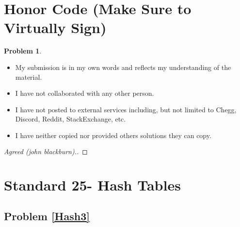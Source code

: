 \documentclass[11pt]{article}
\theoremstyle{definition}
\theoremstyle{definition}
\newtheorem{required}{Problem}
\theoremstyle{definition}
\begin{document}
\section{Honor Code (Make Sure to Virtually Sign)} \label{HonorCode}

\begin{required}
\noindent 
\begin{itemize}
\item My submission is in my own words and reflects my understanding of the material.
\item I have not collaborated with any other person.
\item I have not posted to external services including, but not limited to Chegg, Discord, Reddit, StackExchange, etc.
\item I have neither copied nor provided others solutions they can copy.
\end{itemize}

\end{required}

\begin{proof}[Agreed (john blackburn).]
\end{proof}


\newpage
\section{Standard 25- Hash Tables}
\subsection{Problem \ref{Hash3}}
\end{document}
